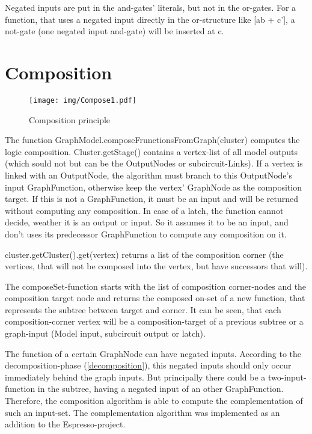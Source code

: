 \documentclass[colorback,accentcolor=tud1c,11pt]{tudreport}
\begin{document}
Negated inputs are put in the and-gates' literals, but not in the or-gates. For a function, that uses a negated input directly in the or-structure like [ab + c'], a not-gate (one negated input and-gate) will be inserted at c.







\chapter{Composition}
\label{composition}
\begin{wrapfigure}{r}{0.41\textwidth}
\centering
\texttt{[image: img/Compose1.pdf]}\\
\caption{Composition principle}
\label{fig:compose1}
\end{wrapfigure}
The function GraphModel.composeFrunctionsFromGraph(cluster) computes the logic composition. Cluster.getStage() contains a vertex-list of all model outputs (which sould not but can be the OutputNodes or subcircuit-Links). If a vertex is linked with an OutputNode, the algorithm must branch to this OutputNode's input GraphFunction, otherwise keep the vertex' GraphNode as the composition target. If this is not a GraphFunction, it must be an input and will be returned without computing any composition. In case of a latch, the function cannot decide, weather it is an output or input. So it assumes it to be an input, and don't uses its predecessor GraphFunction to compute any composition on it.

cluster.getCluster().get(vertex) returns a list of the composition corner (the vertices, that will not be composed into the vertex, but have successors that will).

The composeSet-function starts with the list of composition corner-nodes and the composition target node and returns the composed on-set of a new function, that represents the subtree between target and corner. It can be seen, that each composition-corner vertex will be a composition-target of a previous subtree or a graph-input (Model input, subcircuit output or latch).

The function of a certain GraphNode can have negated inputs. According to the decomposition-phase (\ref{decomposition}), this negated inputs should only occur immediately behind the graph inputs. But principally there could be a two-input-function in the subtree, having a negated input of an other GraphFunction. Therefore, the composition algorithm is able to compute the complementation of such an input-set. The complementation algorithm was implemented as an addition to the Espresso-project.
\end{document}
